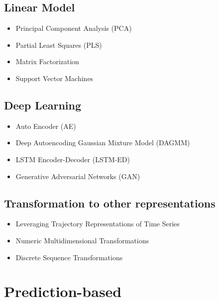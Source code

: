 \subsection{Linear Model}

\begin{itemize}
    \item Principal Component Analysis (PCA) \cite{Li2019a}
    \item Partial Least Squares (PLS) \cite{Li2019a}
    \item Matrix Factorization \cite{Aggarwal2013a}
    \item Support Vector Machines \cite{Aggarwal2013a}
\end{itemize}

\subsection{Deep Learning}

\begin{itemize}
    \item Auto Encoder (AE) \cite{Li2019a}
    \item Deep Autoencoding Gaussian Mixture Model (DAGMM) \cite{Li2019a}
    \item LSTM Encoder-Decoder (LSTM-ED) \cite{Li2019a}
    \item Generative Adversarial Networks (GAN) \cite{Li2019a}
\end{itemize}

\subsection{Transformation to other representations}

\begin{itemize}
    \item Leveraging Trajectory Representations of Time Series \cite{Aggarwal2013a}
    \item Numeric Multidimensional Transformations \cite{Aggarwal2013a}
    \item Discrete Sequence Transformations \cite{Aggarwal2013a}
\end{itemize}

\newpage



\section{Prediction-based}

